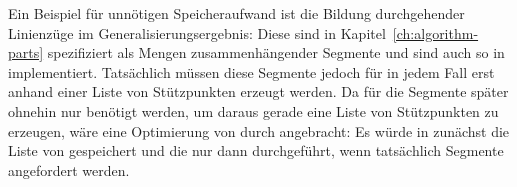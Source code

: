 \documentclass[../main/thesis.tex]{subfiles}
\begin{document}
Ein Beispiel für unnötigen Speicheraufwand ist die Bildung durchgehender Linienzüge im Generalisierungsergebnis:
Diese sind in Kapitel~\ref{ch:algorithm-parts} spezifiziert als Mengen zusammenhängender Segmente und sind auch so in  implementiert.
Tatsächlich müssen diese Segmente jedoch für  in jedem Fall erst anhand einer Liste von Stützpunkten erzeugt werden.
Da für  die Segmente später ohnehin nur benötigt werden, um daraus gerade eine Liste von Stützpunkten zu erzeugen, wäre eine Optimierung von  durch  angebracht:
Es würde in  zunächst die Liste von  gespeichert und die  nur dann durchgeführt, wenn tatsächlich Segmente angefordert werden.



\onlyinsubfile{\listoffigures}
\onlyinsubfile{}
\end{document}
